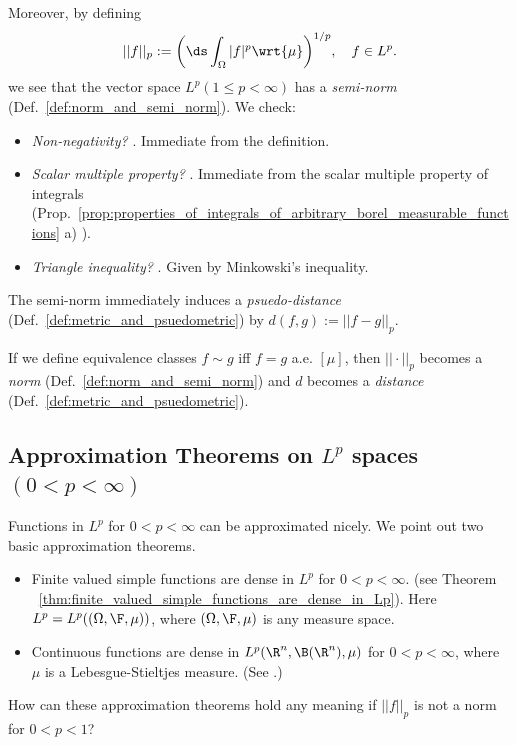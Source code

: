 \documentclass{article} %
\newcommand{\dmu}{\wrt{\mu}}
\begin{document}
Moreover, by defining
\begin{align}
||f||_p := \bigg( \ds\int_\Omega |f|^p \dmu \bigg)^{1/p}, \quad f \in L^p.	
\end{align}
we see that the vector space $L^p (1 \leq p < \infty) $  has a \textit{semi-norm} (Def.~\ref{def:norm_and_semi_norm}). We check:
\begin{itemize}
\item \textit{Non-negativity?}  \greencheck. Immediate from the definition.
\item \textit{Scalar multiple property?}  \greencheck. Immediate from the scalar multiple property of integrals (Prop.~\ref{prop:properties_of_integrals_of_arbitrary_borel_measurable_functions} a) ). 
\item \textit{Triangle inequality?} \greencheck.  Given by Minkowski's inequality.
\end{itemize}
The semi-norm immediately induces a \textit{psuedo-distance} (Def.~\ref{def:metric_and_psuedometric}) by $d(f,g) := ||f-g||_p$.

If we define equivalence classes $f \sim g$ iff $f=g$ a.e. $[\mu]$, then $||\cdot||_p$ becomes a \textit{norm} (Def.~\ref{def:norm_and_semi_norm}) and $d$ becomes a \textit{distance} (Def.~\ref{def:metric_and_psuedometric}).   



\subsection{Approximation Theorems on $L^p$ spaces $(0<p<\infty)$} \label{sec:approximation_theorems_on_Lp_spaces}

Functions in $L^p$ for $0<p<\infty$ can be approximated nicely.  We point out two basic approximation theorems.

\begin{itemize}
\item Finite valued simple functions are dense in $L^p$ for $0<p<\infty$. (see Theorem ~\ref{thm:finite_valued_simple_functions_are_dense_in_Lp}). Here  $L^p = L^p((\Omega, \F, \mu))$, where $(\Omega, \F, \mu)$ is any measure space.

\item Continuous functions are dense in $L^p(\R^n, \B(\R^n), \mu)$ for $0<p<\infty$, where $\mu$ is a Lebesgue-Stieltjes measure.  (See \cite[Thm~2.4.14]{ash2000probability}.)
\end{itemize}

\begin{exercise}
How can these approximation theorems hold any meaning if $||f||_p$ is not a norm for $0 < p < 1$?	
\end{exercise}
\end{document}
